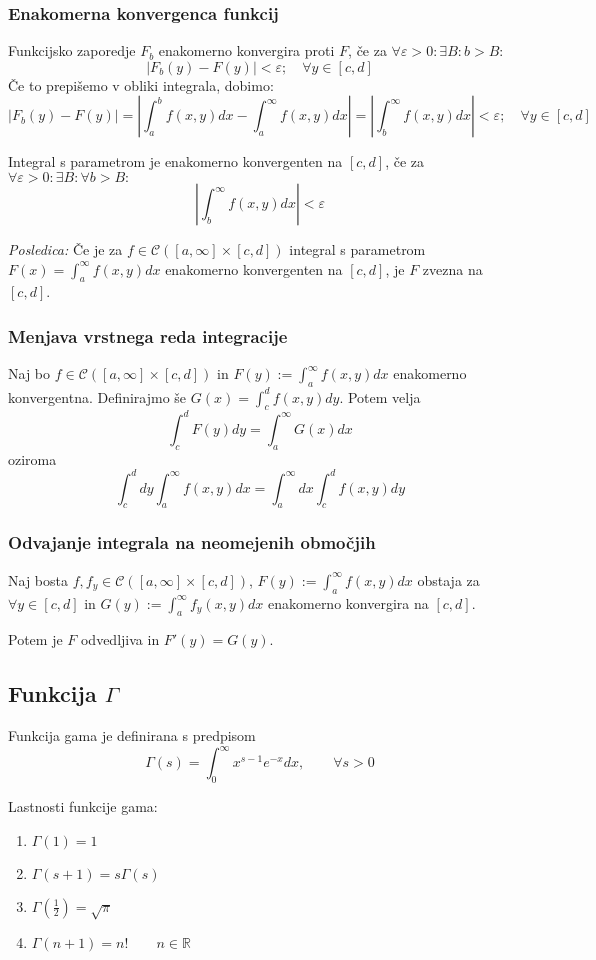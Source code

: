 \documentclass[11pt,a4paper]{article}
\begin{document}
\subsubsection*{Enakomerna konvergenca funkcij}
Funkcijsko zaporedje $F_b$ enakomerno konvergira proti $F$, če za $\forall \varepsilon > 0 : \exists B : b > B :$
\[ |F_b(y)-F(y)| < \varepsilon; \quad \forall y \in [c,d]\]
Če to prepišemo v obliki integrala, dobimo:
\[ |F_b(y) - F(y)| = \left|\int_a^b f(x,y)dx - \int_a^{\infty} f(x,y)dx \right| = \left|\int_b^{\infty} f(x,y)dx \right| < \varepsilon; \quad \forall y \in [c,d]\]

Integral s parametrom je enakomerno konvergenten na $[c,d]$, če za $\forall \varepsilon > 0 : \exists B : \forall b > B :$
\[ \left|\int_b^{\infty} f(x,y)dx \right| < \varepsilon \]

\emph{Posledica:} Če je za $f \in \mathcal{C}([a,\infty] \times [c,d])$ integral s parametrom $F(x) = \int_a^{\infty} f(x,y) dx$ enakomerno konvergenten na $[c,d]$, je $F$ zvezna na $[c,d]$.

\subsubsection*{Menjava vrstnega reda integracije}
Naj bo $f \in \mathcal{C} ([a,\infty] \times [c,d])$ in $ F(y) := \int_a^{\infty} f(x,y) dx$ enakomerno konvergentna. Definirajmo še $G(x) = \int_c^d f(x,y) dy$. Potem velja
\[\int_c^d F(y) dy = \int_a^{\infty} G(x) dx  \]
oziroma
\[\int_c^d dy \int_a^{\infty} f(x,y) dx = \int_a^{\infty} dx \int_c^d f(x,y) dy \]

\subsubsection*{Odvajanje integrala na neomejenih območjih}
Naj bosta $f,f_y \in \mathcal{C}([a,\infty]\times [c,d])$, $F(y) := \int_a^{\infty} f(x,y) dx$ obstaja za $\forall y \in [c,d]$ 
in $G(y) := \int_a^{\infty} f_y(x,y) dx$ enakomerno konvergira na $[c,d]$.

Potem je $F$ odvedljiva in $F'(y) = G(y)$.

\subsection*{Funkcija $\Gamma$}
Funkcija gama je definirana s predpisom
\[ \Gamma(s) = \int_0^{\infty} x^{s-1} e^{-x} dx, \qquad \forall s > 0 \]

Lastnosti funkcije gama:
\begin{enumerate}
    \item $\Gamma(1) = 1$
    \item $\Gamma(s+1) = s \Gamma(s)$
    \item $\Gamma(\frac{1}{2}) = \sqrt{\pi}$
    \item $\Gamma(n+1) = n!\qquad n\in \mathbb{R}$
\end{enumerate}
\end{document}
